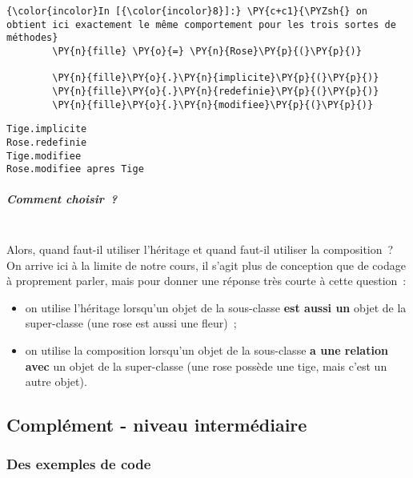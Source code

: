     \begin{Verbatim}[commandchars=\\\{\}]
{\color{incolor}In [{\color{incolor}8}]:} \PY{c+c1}{\PYZsh{} on obtient ici exactement le même comportement pour les trois sortes de méthodes}
        \PY{n}{fille} \PY{o}{=} \PY{n}{Rose}\PY{p}{(}\PY{p}{)}
        
        \PY{n}{fille}\PY{o}{.}\PY{n}{implicite}\PY{p}{(}\PY{p}{)}
        \PY{n}{fille}\PY{o}{.}\PY{n}{redefinie}\PY{p}{(}\PY{p}{)}
        \PY{n}{fille}\PY{o}{.}\PY{n}{modifiee}\PY{p}{(}\PY{p}{)}
\end{Verbatim}


    \begin{Verbatim}[commandchars=\\\{\}]
Tige.implicite
Rose.redefinie
Tige.modifiee
Rose.modifiee apres Tige

    \end{Verbatim}

    \hypertarget{comment-choisir}{%
\subparagraph{Comment choisir~?\\\\}\label{comment-choisir}}

    Alors, quand faut-il utiliser l'héritage et quand faut-il utiliser la
composition~?\\
On arrive ici à la limite de notre cours, il s'agit plus de conception
que de codage à proprement parler, mais pour donner une réponse très
courte à cette question~:

\begin{itemize}
\tightlist
\item
  on utilise l'héritage lorsqu'un objet de la sous-classe \textbf{est
  aussi un} objet de la super-classe (une rose est aussi une fleur)~;
\item
  on utilise la composition lorsqu'un objet de la sous-classe \textbf{a
  une relation avec} un objet de la super-classe (une rose possède une
  tige, mais c'est un autre objet).
\end{itemize}

    \hypertarget{compluxe9ment---niveau-intermuxe9diaire}{%
\subsection{Complément - niveau
intermédiaire}\label{compluxe9ment---niveau-intermuxe9diaire}}

    \hypertarget{des-exemples-de-code}{%
\subsubsection{Des exemples de code}\label{des-exemples-de-code}}

